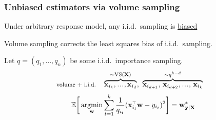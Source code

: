 \documentclass{beamer}
\begin{document}
\begin{frame}
  \frametitle{Unbiased estimators via volume sampling}
  Under arbitrary response model, any i.i.d.~sampling is \underline{biased}
\begin{theorem}
Volume sampling corrects the least squares bias of i.i.d.~sampling.
\end{theorem}\pause
\vspace{3mm}
Let $q=(q_1,\dots,q_n)$ be some i.i.d.~importance sampling.
\begin{align*}
\text{\footnotesize volume + i.i.d.}\quad
  &\overbrace{\x_{i_1},\mydots,\x_{i_d}}^{\sim\Vol(\X)},\
  \overbrace{\x_{i_{d+1}},\,\x_{i_{d+2}},\mydots,\,\x_{i_{k}}}^{\sim q^{k-d}}
\end{align*}
\pause
\begin{align*}
  \E\bigg[\argmin_\w\sum_{t=1}^k\frac1{q_{i_t}}(\x_{i_t}^\top\w-y_{i_t})^2\bigg]
  = \w_{\y|\X}^*
\end{align*}
\end{frame}


\end{document}
